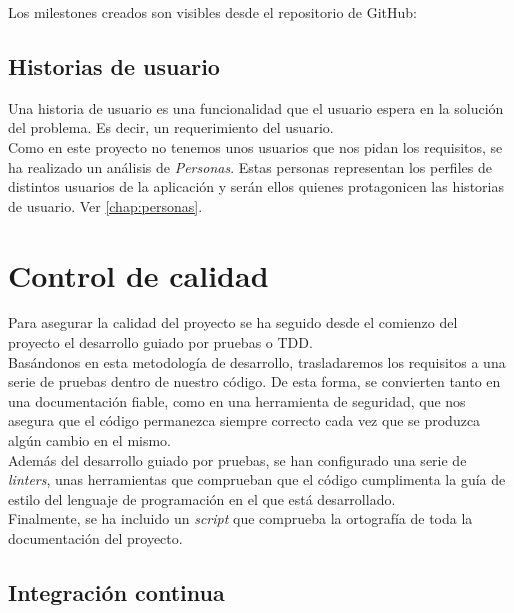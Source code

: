 Los milestones creados son visibles desde el repositorio de GitHub:

\subsection{Historias de usuario}
Una historia de usuario es una funcionalidad que el usuario espera en la solución del problema. Es decir, un
requerimiento del usuario.\\


Como en este proyecto no tenemos unos usuarios que nos pidan los requisitos, se ha realizado un análisis de
\textit{Personas}\cite{personas}. Estas personas representan los perfiles de distintos usuarios de la aplicación y
serán ellos quienes protagonicen las historias de usuario. Ver \autoref{chap:personas}.\\

\section{Control de calidad}\label{sec:control_de_calidad}
Para asegurar la calidad del proyecto se ha seguido desde el comienzo del proyecto el desarrollo guiado por pruebas o
TDD\cite{TDD}.\\

Basándonos en esta metodología de desarrollo, trasladaremos los requisitos a una serie de pruebas dentro de nuestro
código. De esta forma, se convierten tanto en una documentación fiable, como en una herramienta de seguridad, que
nos asegura que el código permanezca siempre correcto cada vez que se produzca algún cambio en el mismo.\\

Además del desarrollo guiado por pruebas, se han configurado una serie de \textit{linters}, unas herramientas que
comprueban que el código cumplimenta la guía de estilo del lenguaje de programación en el que está desarrollado.\\

Finalmente, se ha incluido un \textit{script} que comprueba la ortografía de toda la documentación del proyecto.\\

\subsection{Integración continua}

